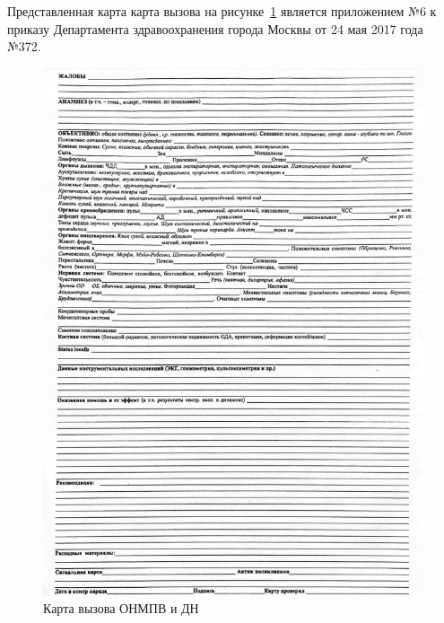 
Представленная карта карта вызова на рисунке~\ref{fig:medical-card} является приложением №6 к приказу Департамента здравоохранения города Москвы от 24 мая 2017 года №372\cite{appendix6}.


\begin{figure}
  \includegraphics[scale=1]{styles/diploma/inc/medical-card.png}
  \caption{Карта вызова ОНМПВ и ДН}
  \label{fig:medical-card}
\end{figure}